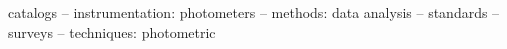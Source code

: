 \documentclass[fleqn,usenatbib]{mnras}
\begin{document}
\begin{abstract}
\end{abstract}

\begin{keywords}
catalogs -- instrumentation: photometers -- methods: data analysis -- standards -- surveys --
techniques: photometric
\end{keywords}
\end{document}

